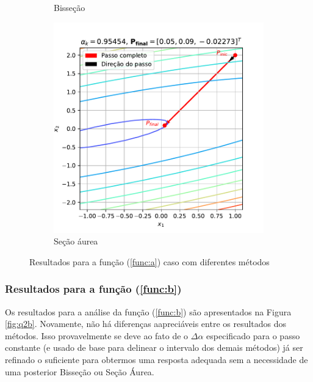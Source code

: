 \documentclass[10pt, a4paper]{article}
\begin{document}
\begin{figure}
\begin{subfigure}[b]{0.32\textwidth}
      \caption{Bisseção}
      \label{fig:q2a_2}
  \end{subfigure}
  \hfill
  \begin{subfigure}[b]{0.32\textwidth}
      \centering
      \includegraphics[width=\textwidth]{images/q2a_3.pdf}
      \caption{Seção áurea}
      \label{fig:q2a_3}
  \end{subfigure}
  \caption{Resultados para a função (\ref{func:a}) caso com diferentes métodos}
  \label{fig:q2a}
\end{figure}

\subsubsection{Resultados para a função (\ref{func:b})}

Os resultados para a análise da função (\ref{func:b}) são apresentados na Figura \ref{fig:q2b}. Novamente, não há 
diferenças aapreciáveis entre os resultados dos métodos. Isso provavelmente se deve ao fato de o $\Delta\alpha$ especificado para
o passo constante (e usado de base para delinear o intervalo dos demais métodos) já ser refinado o suficiente para 
obtermos uma resposta adequada sem a necessidade de uma posterior Bisseção ou Seção Áurea.
\end{document}
